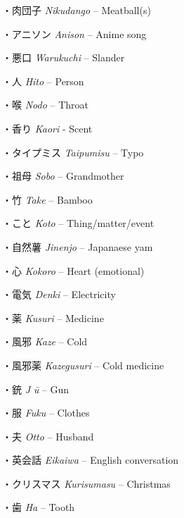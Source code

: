 \par{・肉団子 \emph{Nikudango }– Meatball(s) }
 
\par{・アニソン \emph{Anison }– Anime song }
 
\par{・悪口 \emph{Warukuchi }– Slander }
 
\par{・人 \emph{Hito }– Person }
 
\par{・喉 \emph{Nodo }– Throat }
 
\par{・香り \emph{Kaori }- Scent }
 
\par{・タイプミス \emph{Taipumisu }– Typo }
 
\par{・祖母 \emph{Sobo }– Grandmother }
 
\par{・竹 \emph{Take }– Bamboo }
 
\par{・こと \emph{Koto }– Thing\slash matter\slash event }
 
\par{・自然薯 \emph{Jinenjo }– Japanaese yam }
 
\par{・心 \emph{Kokoro }– Heart (emotional) }
 
\par{・電気 \emph{Denki }– Electricity }
 
\par{・薬 \emph{Kusuri }– Medicine }
 
\par{・風邪 \emph{Kaze }– Cold }
 
\par{・風邪薬 \emph{Kazegusuri }– Cold medicine }
 
\par{・銃 \emph{J }\emph{ū }– Gun }
 
\par{・服 \emph{Fuku }– Clothes }
 
\par{・夫 \emph{Otto }– Husband }
 
\par{・英会話 \emph{Eikaiwa }– English conversation }
 
\par{・クリスマス \emph{Kurisumasu }– Christmas }
 
\par{・歯 \emph{Ha }– Tooth }
 
